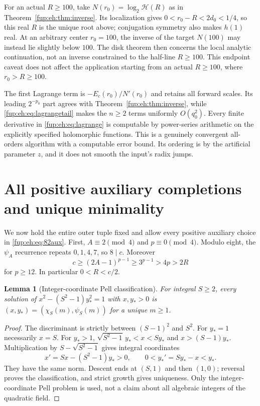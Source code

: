 \documentclass[11pt,letterpaper]{article}
\newtheorem{lemma}[theorem]{Lemma}
\theoremstyle{definition}\newtheorem{definition}[theorem]{Definition}
\theoremstyle{remark}\newtheorem{remark}[theorem]{Remark}
\begin{document}
For an actual $R\ge100$, take $N(r_0)=\log_2\mathcal H(R)$
as in Theorem~\ref{fup:eh:thm:inverse}. Its localization gives
$0<r_0-R<2d_0<1/4$, so this real $R$ is the unique root above;
conjugation symmetry also makes $h(1)$ real. At an arbitrary center
$r_0=100$, the inverse of the target $N(100)$ may instead lie
slightly below $100$. The disk theorem then concerns the local
analytic continuation, not an inverse constrained to the half-line
$R\ge100$. This endpoint caveat does not affect the application
starting from an actual $R\ge100$, where $r_0>R\ge100$.

The first Lagrange term is $-E_c(r_0)/N'(r_0)$ and retains all
forward scales. Its leading $2^{-p_0}$ part agrees with
Theorem~\ref{fup:eh:thm:inverse}, while \eqref{fup:eh:eq:lagrangetail} makes
the $n\ge2$ terms uniformly $O(q_0^2)$.
Every finite derivative in \eqref{fup:eh:eq:lagrange} is computable by
power-series arithmetic on the explicitly specified holomorphic
functions. This is a genuinely convergent all-orders algorithm with
a computable error bound. Its ordering is by the artificial parameter
$z$, and it does not smooth the input's radix jumps.

\section{All positive auxiliary completions and unique minimality}
\label{fup:eh:sec:minimum}
We now hold the entire outer tuple fixed and allow every positive
auxiliary choice in \eqref{fup:eh:eq:82aux}. First,
$A\equiv2\pmod4$ and $p\equiv0\pmod4$. Modulo eight, the
$\psi_A$ recurrence repeats $0,1,4,7$, so $8\mid c$. Moreover
\[
 c\ge(2A-1)^{p-1}\ge3^{p-1}>4p>2R
\]
for $p\ge12$. In particular $0<R<c/2$.

\begin{lemma}[Integer-coordinate Pell classification]\label{fup:eh:lem:pellclass}
For integral $S\ge2$, every solution of
$x^2-(S^2-1)y_*^2=1$ with $x,y_*>0$ is
$(x,y_*)=(\chi_S(m),\psi_S(m))$ for a unique $m\ge1$.
\end{lemma}
\begin{proof}
The discriminant is strictly between $(S-1)^2$ and $S^2$.
For $y_*=1$ necessarily $x=S$. For $y_*>1$,
$\sqrt{S^2-1}\,y_*<x<Sy_*$ and $x>(S-1)y_*$.
Multiplication by $S-\sqrt{S^2-1}$ gives integral coordinates
\[
 x'=Sx-(S^2-1)y_*>0,\qquad 0<y_*'=Sy_*-x<y_*.
\]
They have the same norm. Descent ends at $(S,1)$ and then $(1,0)$;
reversal proves the classification, and strict growth gives uniqueness.
Only the integer-coordinate Pell problem is used, not a claim about
all algebraic integers of the quadratic field.
\end{proof}
\end{document}
